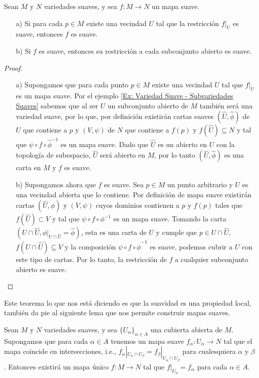 \begin{theorem}
	Sean $M$ y $N$ variedades suaves, y sea $f: M \to N$ un mapa suave.
	\begin{itemize}
		\item [a)] Si para cada $p \in M$ existe una vecindad $U$ tal que la restricción $f|_U$ es suave, entonces $f$ es suave.
		\item [b)] Si $f$ es suave, entonces su restricción a cada subconjunto abierto es suave.
	\end{itemize}
\end{theorem}

\begin{proof}
	\begin{itemize}
		\item[a)] Supongamos que para cada punto $p \in M$ existe una vecindad $U$ tal que $f|_U$ es un mapa suave. Por el ejemplo \ref{Ex: Variedad Suave - Subvariedades Suaves} sabemos que al ser $U$ un subconjunto abierto de $M$ también será una variedad suave, por lo que, por definición existirán cartas suaves $(\hat{U},\hat{\phi})$ de $U$ que contiene a $p$ y $(V,\psi)$ de $N$ que contiene a $f(p)$ y $f(\hat{U}) \subseteq N$ y tal que $\psi \circ f \circ \hat{\phi}^{-1}$ es un mapa suave. Dado que $\hat{U}$ es un abierto en $U$ con la topología de subespacio, $\hat{U}$ será abierto en $M$, por lo tanto $(\hat{U},\hat{\phi})$ es una carta en $M$ y $f$ es suave.

		\item [b)] Supongamos ahora que $f$ es suave. Sea $p \in M$ un punto arbitrario y $U$ es una vecindad abierta que lo contiene. Por definición de mapa suave existirán cartas $(\hat{U}, \phi)$ y $(V,\psi)$ cuyos dominios contienen a $p$ y $f(p)$ tales que $f(\hat{U}) \subset V$ y tal que $\psi \circ f \circ \phi^{-1}$ es un mapa suave. Tomando la carta $(U \cap \hat{U},\phi|_{U \cap \hat{U}} = \hat{\phi})$, esta es una carta de $U$ y cumple que $p \in U \cap \hat{U}$, $f(U \cap \hat{U}) \subseteq V$ y la composición $\psi \circ f \circ \hat{\phi}^{-1}$ es suave, podemos cubrir a $U$ con este tipo de cartas. Por lo tanto, la restricción de $f$ a cualquier subconjunto abierto es suave.
	\end{itemize}
\end{proof}

Este teorema lo que nos está diciendo es que la suavidad es una propiedad local, también da pie al siguiente lema que nos permite construir mapas suaves.

\begin{corollary}
	Sean $M$ y $N$ variedades suaves, y sea $\{U_{\alpha}\}_{\alpha \in A}$ una cubierta abierta de $M$. Supongamos que para cada $\alpha \in A$ tenemos un mapa suave $f_{\alpha}: U_{\alpha} \to N$ tal que el mapa coincide en intersecciones, i.e., $f_{\alpha}|_{U_\alpha \cap U_\beta} = f_{\beta}|_{U_\alpha \cap U_\beta}$ para cualesquiera $\alpha$ y $\beta$. Entonces existirá un mapa único $f:M \to N$ tal que $f|_{U_\alpha} = f_{\alpha}$ para cada $\alpha \in A$.
\end{corollary}


